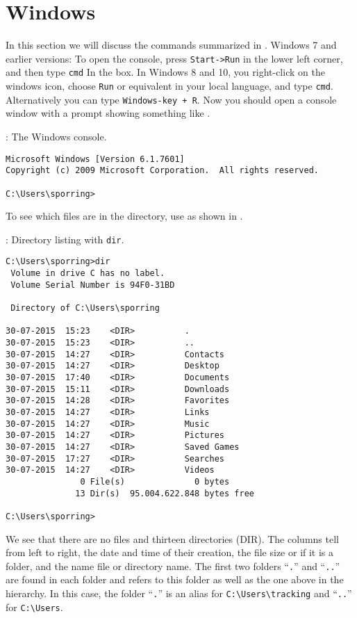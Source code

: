 \section{Windows}
In this section we will discuss the commands summarized in . Windows 7 and earlier versions: To open the console, press \lstinline[language=console]{Start->Run} in the lower left corner, and then type \lstinline[language=console]{cmd} In the box. In Windows 8 and 10, you right-click on the windows icon, choose \lstinline[language=console]{Run} or equivalent in your local language, and type \lstinline[language=console]{cmd}. Alternatively you can type \lstinline[language=console]{Windows-key + R}. Now you should open a console window with a prompt showing something like .
\begin{codeNOutput}[label=windowsConsole]{: The Windows console.}
  \begin{lstlisting}[language=console,escapechar=§]
Microsoft Windows [Version 6.1.7601]
Copyright (c) 2009 Microsoft Corporation.  All rights reserved.

C:\Users\sporring>
\end{lstlisting}
\end{codeNOutput}
To see which files are in the directory, use  as shown in .
\begin{codeNOutput}[label=windowsDir]{: Directory listing with \lstinline[language=console]{dir}.}
  \begin{lstlisting}[language=console,escapechar=§]
C:\Users\sporring>dir
 Volume in drive C has no label.
 Volume Serial Number is 94F0-31BD

 Directory of C:\Users\sporring

30-07-2015  15:23    <DIR>          .
30-07-2015  15:23    <DIR>          ..
30-07-2015  14:27    <DIR>          Contacts
30-07-2015  14:27    <DIR>          Desktop
30-07-2015  17:40    <DIR>          Documents
30-07-2015  15:11    <DIR>          Downloads
30-07-2015  14:28    <DIR>          Favorites
30-07-2015  14:27    <DIR>          Links
30-07-2015  14:27    <DIR>          Music
30-07-2015  14:27    <DIR>          Pictures
30-07-2015  14:27    <DIR>          Saved Games
30-07-2015  17:27    <DIR>          Searches
30-07-2015  14:27    <DIR>          Videos
               0 File(s)              0 bytes
              13 Dir(s)  95.004.622.848 bytes free

C:\Users\sporring>
\end{lstlisting}
\end{codeNOutput}
We see that there are no files and thirteen directories (DIR). The columns tell from left to right, the date and time of their creation, the file size or if it is a folder, and the name file or directory name. The first two folders ``\lstinline[language=console]{.}'' and ``\lstinline[language=console]{..}'' are found in each folder and refers to this folder as well as the one above in the hierarchy. In this case, the folder ``\lstinline[language=console]{.}'' is an alias for \lstinline[language=console]{C:\Users\tracking} and ``\lstinline[language=console]{..}'' for \lstinline[language=console]{C:\Users}.

